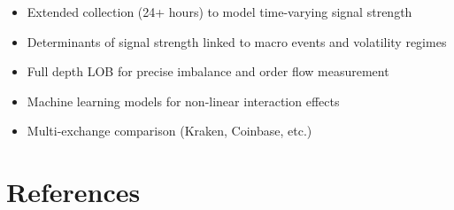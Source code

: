 \documentclass[12pt,a4paper]{article}
\begin{document}
\begin{itemize}
    \item Extended collection (24+ hours) to model time-varying signal strength
    \item Determinants of signal strength linked to macro events and volatility regimes
    \item Full depth LOB for precise imbalance and order flow measurement
    \item Machine learning models for non-linear interaction effects
    \item Multi-exchange comparison (Kraken, Coinbase, etc.)
\end{itemize}

\section*{References}

\begin{singlespace}


\end{singlespace}
\end{document}
